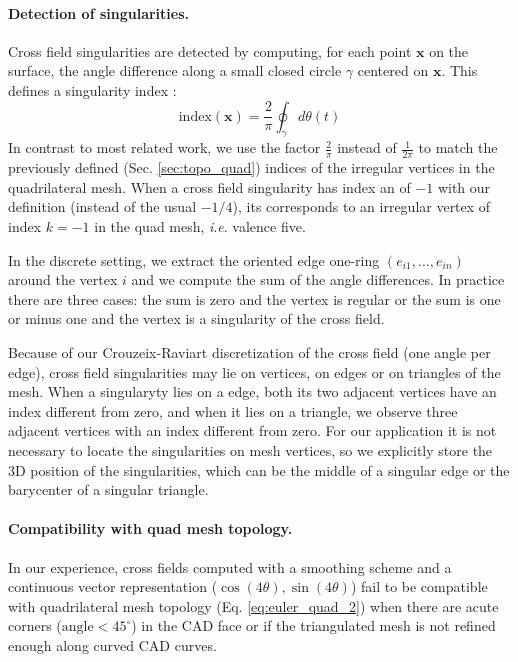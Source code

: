 \documentclass[AMA,STIX1COL]{WileyNJD-v2}
\newcommand{\vx}{\ensuremath{\mathbf{x}}}
\newcommand{\ie}{\textit{i}.\textit{e}. }
\newcommand\rsec[1]{Sec. \ref{#1}}
\newcommand\reqt[1]{Eq. \ref{#1}}
\begin{document}
{\paragraph{Detection of singularities.} Cross field singularities are
detected by computing, for each point $\vx$ on the surface, the angle difference along a small 
closed circle $\gamma$ centered on $\vx$. This defines a singularity index \cite{Ray2008}:
\begin{equation}
    \text{index}(\vx) = \frac{2}{\pi} \oint_{\gamma} d\theta (t)
\end{equation}
In contrast to most related work, we use the factor $\frac{2}{\pi}$ instead
of $\frac{1}{2 \pi}$ to match the previously defined (\rsec{sec:topo_quad}) indices of the irregular vertices in the
quadrilateral mesh. When a cross field singularity has
index an of $-1$ with our definition (instead of the usual $-1/4$), its
corresponds to an irregular vertex of index $k=-1$ in the quad mesh, \ie valence five.

In the discrete setting, we extract the oriented edge one-ring $(e_{i1}, ..., e_{in})$
around the vertex $i$ and we compute the sum of the angle differences.
In practice there are three cases: the sum is zero and the vertex is regular or the sum is
one or minus one and the vertex is a singularity of the cross field.

Because of our Crouzeix-Raviart discretization of the cross field (one angle
per edge), cross field singularities may lie on vertices, on edges or on
triangles of the mesh.  When a singularyty lies on a edge, both its
two adjacent vertices have an index different from zero, and when it lies on a triangle, we observe three
adjacent vertices with an index different from zero. For our application it is not necessary
to locate the singularities on mesh vertices, so we explicitly
store the 3D position of the singularities, which can be the middle of a
singular edge or the barycenter of a singular triangle.

\paragraph{Compatibility with quad mesh topology.}
In our experience, cross fields computed with a smoothing scheme and a
continuous vector representation ($\cos(4\theta),\sin(4\theta)$) fail to be compatible with quadrilateral mesh
topology (\reqt{eq:euler_quad_2}) when there are acute corners ($\text{angle} <
45^\circ$) in the CAD face or if the triangulated mesh is not refined enough
along curved CAD curves.

}
\end{document}
